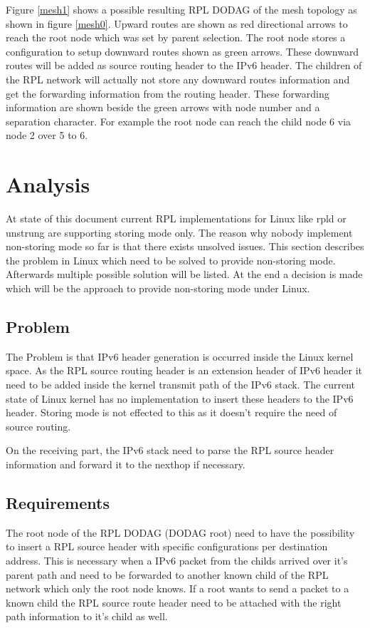 \documentclass[letterpaper]{article}
\begin{document}
Figure \ref{mesh1} shows a possible resulting RPL DODAG of the mesh topology as shown in figure \ref{mesh0}.
Upward routes are shown as red directional arrows to reach the root node which was set by parent selection.
The root node stores a configuration to setup downward routes shown as green arrows.
These downward routes will be added as source routing header to the IPv6 header.
The children of the RPL network will actually not store any downward routes information and get the forwarding information from the routing header.
These forwarding information are shown beside the green arrows with node number and a separation character.
For example the root node can reach the child node 6 via node 2 over 5 to 6.

\section{Analysis}

At state of this document current RPL implementations for Linux like rpld or unstrung \cite{unstrung} are supporting storing mode only.
The reason why nobody implement non-storing mode so far is that there exists unsolved issues.
This section describes the problem in Linux which need to be solved to provide non-storing mode.
Afterwards multiple possible solution will be listed.
At the end a decision is made which will be the approach to provide non-storing mode under Linux.

\subsection{Problem}

The Problem is that IPv6 header generation is occurred inside the Linux kernel space.
As the RPL source routing header is an extension header of IPv6 header it need to be added inside the kernel transmit path of the IPv6 stack.
The current state of Linux kernel has no implementation to insert these headers to the IPv6 header.
Storing mode is not effected to this as it doesn't require the need of source routing.

On the receiving part, the IPv6 stack need to parse the RPL source header information and forward it to the nexthop if necessary.

\subsection{Requirements}

The root node of the RPL DODAG (DODAG root) need to have the possibility to insert a RPL source header with specific configurations per destination address.
This is necessary when a IPv6 packet from the childs arrived over it's parent path and need to be forwarded to another known child of the RPL network which only the root node knows.
If a root wants to send a packet to a known child the RPL source route header need to be attached with the right path information to it's child as well.
\end{document}
